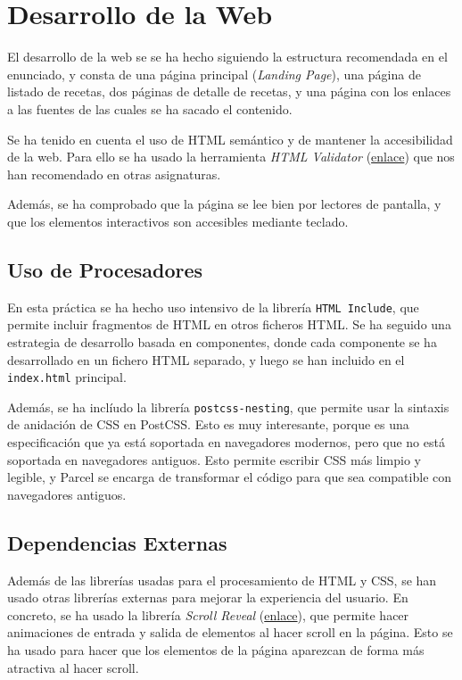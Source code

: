 \documentclass{article}
\begin{document}
\section{Desarrollo de la Web}\label{sec:desarrollo-de-la-web}

El desarrollo de la web se se ha hecho siguiendo la estructura recomendada en el enunciado, y consta de una página principal (\textit{Landing Page}), una página de listado de recetas, dos páginas de detalle de recetas, y una página con los enlaces a las fuentes de las cuales se ha sacado el contenido.

Se ha tenido en cuenta el uso de HTML semántico y de mantener la accesibilidad de la web. Para ello se ha usado la herramienta \textit{HTML Validator} (\href{https://validator.w3.org/}{enlace}) que nos han recomendado en otras asignaturas.

Además, se ha comprobado que la página se lee bien por lectores de pantalla, y que los elementos interactivos son accesibles mediante teclado.

\subsection{Uso de Procesadores}\label{subsec:uso-de-procesadores}

En esta práctica se ha hecho uso intensivo de la librería \lstinline|HTML Include|, que permite incluir fragmentos de HTML en otros ficheros HTML. Se ha seguido una estrategia de desarrollo basada en componentes, donde cada componente se ha desarrollado en un fichero HTML separado, y luego se han incluido en el \lstinline|index.html| principal.

Además, se ha inclíudo la librería \lstinline|postcss-nesting|, que permite usar la sintaxis de anidación de CSS en PostCSS. Esto es muy interesante, porque es una especificación que ya está soportada en navegadores modernos, pero que no está soportada en navegadores antiguos. Esto permite escribir CSS más limpio y legible, y Parcel se encarga de transformar el código para que sea compatible con navegadores antiguos.

\subsection{Dependencias Externas}\label{subsec:dependencias-externas}

Además de las librerías usadas para el procesamiento de HTML y CSS, se han usado otras librerías externas para mejorar la experiencia del usuario. En concreto, se ha usado la librería \textit{Scroll Reveal} (\href{https://scrollrevealjs.org/}{enlace}), que permite hacer animaciones de entrada y salida de elementos al hacer scroll en la página. Esto se ha usado para hacer que los elementos de la página aparezcan de forma más atractiva al hacer scroll.
\end{document}
